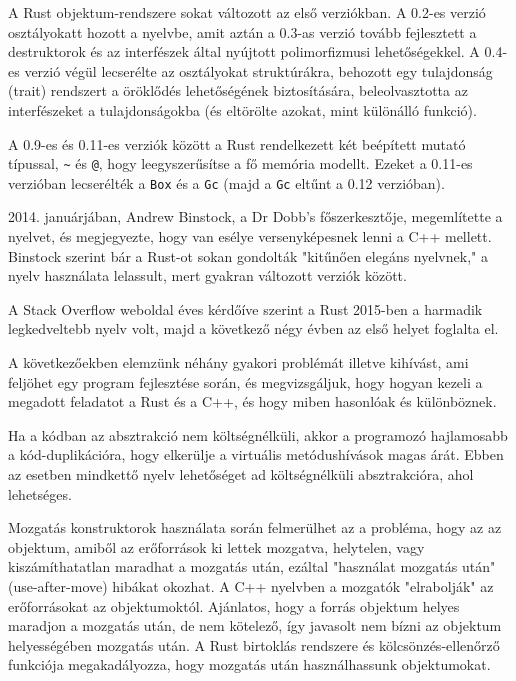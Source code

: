 A Rust objektum-rendszere sokat változott az első verziókban. A 0.2-es verzió osztályokatt hozott a nyelvbe, amit aztán a 0.3-as verzió tovább fejlesztett a destruktorok és az interfészek által nyújtott polimorfizmusi lehetőségekkel.
A 0.4-es verzió végül lecserélte az osztályokat struktúrákra, behozott egy tulajdonság (trait) rendszert a öröklődés lehetőségének biztosítására, 
beleolvasztotta az interfészeket a tulajdonságokba (és eltörölte azokat, mint különálló funkció).\cite{rust:version_history}

A 0.9-es és 0.11-es verziók között a Rust rendelkezett két beépített mutató típussal, \texttt{\~} és \texttt{@}, hogy leegyszerűsítse a fő memória modellt.
Ezeket a 0.11-es verzióban lecserélték a \texttt{Box} és a \texttt{Gc} (majd a \texttt{Gc} eltűnt a 0.12 verzióban).\cite{rust:version_history}

2014. januárjában, Andrew Binstock, a Dr Dobb's főszerkesztője, megemlítette a nyelvet, és megjegyezte, hogy van esélye versenyképesnek lenni a C++ mellett.
Binstock szerint bár a Rust-ot sokan gondolták "kitűnően elegáns nyelvnek," a nyelv használata lelassult, mert gyakran változott verziók között.\cite{dr_dobb}

A Stack Overflow weboldal éves kérdőíve szerint a Rust 2015-ben a harmadik legkedveltebb nyelv volt, majd a következő négy évben az első helyet foglalta el.\cite{so_2015, so_2016, so_2017, so_2018, so_2019}


A következőekben elemzünk néhány gyakori problémát illetve kihívást, ami feljöhet egy program fejlesztése során,
és megvizsgáljuk, hogy hogyan kezeli a megadott feladatot a Rust és a C++, és hogy miben hasonlóak és különböznek.


Ha a kódban az absztrakció nem költségnélküli, akkor a programozó hajlamosabb a kód-duplikációra, hogy elkerülje a virtuális metódushívások magas árát.
Ebben az esetben mindkettő nyelv lehetőséget ad költségnélküli absztrakcióra, ahol lehetséges.\cite{compare:cpp:zerocost, compare:rust:zerocost}

\label{subsec:ownership_mentioned}

Mozgatás konstruktorok használata során felmerülhet az a probléma, hogy az az objektum, amiből az erőforrások ki lettek mozgatva,
helytelen, vagy kiszámíthatatlan maradhat a mozgatás után, ezáltal "használat mozgatás után" (use-after-move) hibákat okozhat.
A C++ nyelvben a mozgatók "elrabolják" az erőforrásokat az objektumoktól. Ajánlatos, hogy a forrás objektum helyes maradjon a mozgatás után,
de nem kötelező, így javasolt nem bízni az objektum helyességében mozgatás után.\cite{compare:cpp:move_constructor}
A Rust birtoklás rendszere és kölcsönzés-ellenőrző funkciója megakadályozza, hogy mozgatás után használhassunk objektumokat.\cite{compare:rust:move_constructor}


